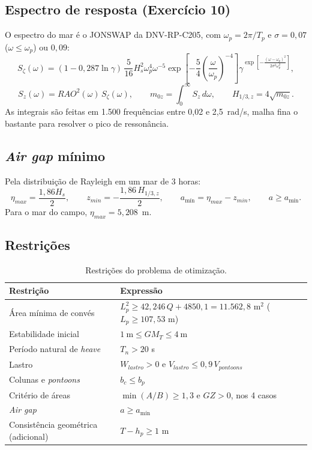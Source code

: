 \documentclass[11pt,a4paper]{article}
\newcommand{\Hz}{H_{1/3,z}}
\begin{document}
\subsection{Espectro de resposta (Exercício 10)}

O espectro do mar é o JONSWAP da DNV-RP-C205, com $\omega_p = 2\pi/T_p$ e $\sigma = 0{,}07$
($\omega \le \omega_p$) ou $0{,}09$:
\begin{equation}
S_\zeta(\omega) = (1 - 0{,}287\ln\gamma)\,\frac{5}{16} H_s^2 \omega_p^4 \omega^{-5}
\exp\!\left[-\frac54\left(\frac{\omega}{\omega_p}\right)^{-4}\right]
\gamma^{\exp\left[-\frac{(\omega - \omega_p)^2}{2\sigma^2\omega_p^2}\right]} ,
\end{equation}
\begin{equation}
S_z(\omega) = RAO^2(\omega)\, S_\zeta(\omega), \qquad m_{0z} = \int_0^\infty S_z\, d\omega,
\qquad \Hz = 4\sqrt{m_{0z}} .
\end{equation}
As integrais são feitas em 1.500 frequências entre 0,02 e 2,5~rad/s, malha fina o bastante
para resolver o pico de ressonância.

\subsection{\emph{Air gap} mínimo}

Pela distribuição de Rayleigh em um mar de 3 horas:
\begin{equation}
\eta_{max} = \frac{1{,}86 H_s}{2}, \qquad z_{min} = -\frac{1{,}86\,\Hz}{2}, \qquad
a_{\text{mín}} = \eta_{max} - z_{min}, \qquad a \ge a_{\text{mín}} .
\end{equation}
Para o mar do campo, $\eta_{max} = 5{,}208$~m.

\subsection{Restrições}

\begin{table}[H]
\centering
\caption{Restrições do problema de otimização.}\label{tab:restricoes}
\begin{tabular}{ll}
\toprule
Restrição & Expressão \\
\midrule
Área mínima de convés & $L_p^2 \ge 42{,}246\,Q + 4850{,}1 = 11.562{,}8$ m$^2$ ($L_p \ge 107{,}53$ m) \\
Estabilidade inicial & $1~\text{m} \le GM_T \le 4~\text{m}$ \\
Período natural de \emph{heave} & $T_n > 20$ s \\
Lastro & $W_{lastro} > 0$ e $V_{lastro} \le 0{,}9\, V_{pontoons}$ \\
Colunas e \emph{pontoons} & $b_c \le b_p$ \\
Critério de áreas & $\min(A/B) \ge 1{,}3$ e $GZ > 0$, nos 4 casos \\
\emph{Air gap} & $a \ge a_{\text{mín}}$ \\
Consistência geométrica (adicional) & $T - h_p \ge 1$ m \\
\bottomrule
\end{tabular}
\end{table}
\end{document}
